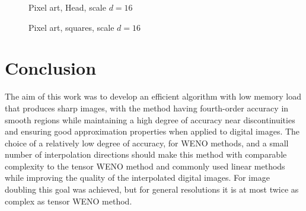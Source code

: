 	\begin{figure}
		\begin{center}
			 \quad 
			 \quad 
			 \quad
			 \quad
			 \quad
			 \quad
			\caption{Pixel art, Head, scale $d=16$}
			\label{fig:yoshi:scale16}
		\end{center}
	\end{figure}
	
	\begin{figure}
		\begin{center}
			 \quad 
			 \quad 
			 \quad
			 \quad
			 \quad
			 \quad
			\caption{Pixel art, squares, scale $d=16$}
			\label{fig:squares:scale16}
		\end{center}
	\end{figure}	



	\section{Conclusion}
	\label{sec:conclusion}
The aim of this work was to develop an efficient algorithm with low memory load that produces sharp images, with the method having fourth-order accuracy in smooth regions while maintaining a high degree of accuracy near discontinuities and ensuring good approximation properties when applied to digital images. The choice of a relatively low degree of accuracy, for WENO methods, and a small number of interpolation directions should make this method {with} comparable complexity to the tensor WENO method {and commonly used linear methods} while improving the quality of the interpolated digital images. For image doubling this goal was achieved, but for general resolutions it is at most twice as complex as {tensor WENO method}.

